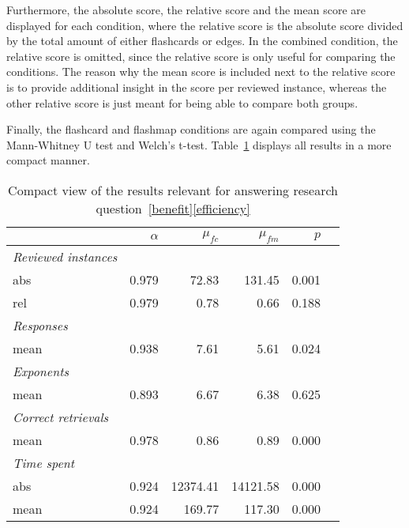 Furthermore, the absolute score, the relative score and the mean score are displayed for each condition, where the relative score is the absolute score divided by the total amount of either flashcards or edges. In the combined condition, the relative score is omitted, since the relative score is only useful for comparing the conditions. The reason why the mean score is included next to the relative score is to provide additional insight in the score per reviewed instance, whereas the other relative score is just meant for being able to compare both groups.

Finally, the flashcard and flashmap conditions are again compared using the Mann-Whitney U test and Welch's t-test. Table~\ref{tab:efficiency} displays all results in a more compact manner.

\begin{table}
    \centering
    \begin{tabular}{lrrrrr}
        \toprule
        & $\alpha$ & $\mu_{fc}$ & $\mu_{fm}$ & $p$ \\
        \midrule
        \emph{Reviewed instances} &&&& \\
        \midrule
        abs & 0.979 & 72.83 & 131.45 & 0.001 \\
        rel & 0.979 & 0.78 & 0.66 & 0.188 \\
        \midrule
        \emph{Responses} &&&& \\
        \midrule
        mean & 0.938 & 7.61 & 5.61 & 0.024 \\
        \midrule
        \multicolumn{5}{l}{\emph{Exponents}} \\
        \midrule
        mean & 0.893 & 6.67 & 6.38 & 0.625 \\
        \midrule
        \emph{Correct retrievals} &&&& \\
        \midrule
        mean & 0.978 & 0.86 & 0.89 & 0.000 \\
        \midrule
        \emph{Time spent} &&&& \\
        \midrule
        abs & 0.924 & 12374.41 & 14121.58 & 0.000 \\
        mean & 0.924 & 169.77 & 117.30 & 0.000 \\
        \bottomrule
    \end{tabular}
    \caption{Compact view of the results relevant for answering research question~\protect\ref{benefit}\protect\ref{efficiency}}
    \label{tab:efficiency}
\end{table}

